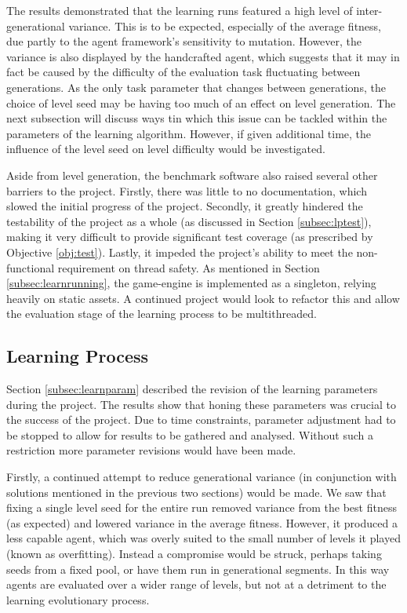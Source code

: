The results demonstrated that the learning runs featured a high level of inter-generational variance. This is to be expected, especially of the average fitness, due partly to the agent framework's sensitivity to mutation. However, the variance is also displayed by the handcrafted agent, which suggests that it may in fact be caused by the difficulty of the evaluation task fluctuating between generations. As the only task parameter that changes between generations, the choice of level seed may be having too much of an effect on level generation. The next subsection will discuss ways tin which this issue can be tackled within the parameters of the learning algorithm. However, if given additional time, the influence of the level seed on level difficulty would be investigated.

Aside from level generation, the benchmark software also raised several other barriers to the project. Firstly, there was little to no documentation, which slowed the initial progress of the project. Secondly, it greatly hindered the testability of the project as a whole (as discussed in Section \ref{subsec:lptest}), making it very difficult to provide significant test coverage (as prescribed by Objective \ref{obj:test}). Lastly, it impeded the project's ability to meet the non-functional requirement on thread safety. As mentioned in Section \ref{subsec:learnrunning}, the game-engine is implemented as a singleton, relying heavily on static assets. A continued project would look to refactor this and allow the evaluation stage of the learning process to be multithreaded.




\subsection{Learning Process}
\label{subsec:evallearn}

Section \ref{subsec:learnparam} described the revision of the learning parameters during the project. The results show that honing these parameters was crucial to the success of the project. Due to time constraints, parameter adjustment had to be stopped to allow for results to be gathered and analysed. Without such a restriction more parameter revisions would have been made.

Firstly, a continued attempt to reduce generational variance (in conjunction with solutions mentioned in the previous two sections) would be made. We saw that fixing a single level seed for the entire run removed variance from the best fitness (as expected) and lowered variance in the average fitness. However, it produced a less capable agent, which was overly suited to the small number of levels it played (known as overfitting). Instead a compromise would be struck, perhaps taking seeds from a fixed pool, or have them run in generational segments. In this way agents are evaluated over a wider range of levels, but not at a detriment to the learning evolutionary process.

